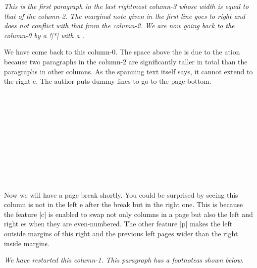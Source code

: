 \begin{paracol}[2]{4}
 \switchcolumn
 \begingroup\sl
 This is the first paragraph
 in the last rightmost column-3 whose width is equal to that of the column-2.
 The marginal note given in the first line goes to right and does not
 conflict with that from the column-2.  We are now going back to the
 column-0 by a {\rm\!\switchcolumn!|*|} with a \mctext.
 \endgroup
 
 
 We have come back to this column-0.  The space above the \mctext{} is due
 to the \sync{}ation because two paragraphs in the column-2 are
 significantly taller in total than the paragraphs in other columns.  As
 the spanning text itself says, it cannot extend to the right \parapag{}e.
 The author puts dummy lines to go to the page bottom.\\
 \Dotfill\\ \Dotfill\\ \Dotfill\\ \Dotfill\\ \Dotfill\\ \Dotfill\\
 \Dotfill\\ \Dotfill\\ \Dotfill\\ \Dotfill\\ \Dotfill\par
 
 Now we will have a page break shortly.  You could be surprised by seeing
 this column is not in the left \parapag{}e after the break but in the
 right one.  This is because the feature |c| is enabled to swap not only
 columns in a page but also the left and right \paired{} \parapag{}es when
 they are even-numbered.  The other feature |p| makes the left outside
 margins of this right and the previous left pages wider than the right
 inside margins.\label{page:ppts-paired2}
 
 \switchcolumn
 \begingroup\it
 We have restarted this column-1.  This paragraph has a
 footnote\footnotemark*[-1] as shown below.\\
 \Dotfill\\ \Dotfill\\ \Dotfill\\ \Dotfill\\ \Dotfill\\ \Dotfill\\
 \Dotfill\\ \Dotfill\\ \Dotfill\\ \Dotfill\\ \Dotfill\\ \Dotfill\\
 \Dotfill\\ \Dotfill\par
 

\end{paracol}
